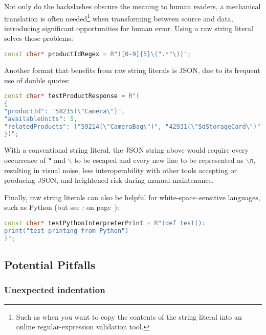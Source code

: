 \noindent Not only do the backslashes obscure the meaning to human readers, a
mechanical translation is often needed{\cprotect\footnote{Such as when
you want to copy the contents of the string literal into an online
regular-expression validation tool.}} when transforming between source
and data, introducing significant opportunities for human error. Using a
raw string literal solves these problems:

\begin{lstlisting}[language=C++]
const char* productIdRegex = R"([0-9]{5}\(".*"\))";
\end{lstlisting}

\noindent Another format that benefits from raw string literals is JSON, due to
its frequent use of double quotes:

\begin{lstlisting}[language=C++]
const char* testProductResponse = R"(
{
"productId": "58215(\"Camera\")",
"availableUnits": 5,
"relatedProducts": ["59214(\"CameraBag\")", "42931(\"SdStorageCard\")"]
})";
\end{lstlisting}

\noindent With a conventional string literal, the JSON string above would require
every occurrence of \texttt{"} and \texttt{$\backslash$} to be escaped
and every new line to be represented as \texttt{$\backslash$n}, resulting
in visual noise, less interoperability with other tools accepting or
producing JSON, and heightened risk during manual maintenance.

Finally, raw string literals can also be helpful for
white-space--sensitive languages, such as Python (but see \textit{: } on page~\pageref{encoding-of-newlines-and-whitespace}):

\begin{lstlisting}[language=C++]
const char* testPythonInterpreterPrint = R"(def test():
print("test printing from Python")
)";
\end{lstlisting}


\subsection[Potential Pitfalls]{Potential Pitfalls}\label{potential-pitfalls-rawstringliteral}

\subsubsection[Unexpected indentation]{Unexpected indentation}\label{unexpected-indentation}

